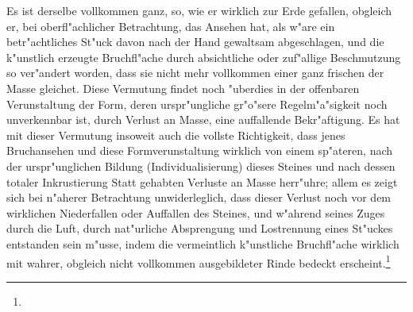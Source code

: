 \documentclass[a4paper, 11pt, oneside, german]{article}
\begin{document}
Es ist derselbe vollkommen ganz, so, wie er wirklich zur Erde gefallen, obgleich er, bei oberfl"achlicher Betrachtung, das Ansehen hat, als w"are ein betr"achtliches St"uck davon nach der Hand gewaltsam abgeschlagen, und die k"unstlich erzeugte Bruchfl"ache durch absichtliche oder zuf"allige Beschmutzung so ver"andert worden, dass sie nicht mehr vollkommen einer ganz frischen der Masse gleichet. Diese Vermutung findet noch "uberdies in der offenbaren Verunstaltung der Form, deren urspr"ungliche gr"o"sere Regelm"a"sigkeit noch unverkennbar ist, durch Verlust an Masse, eine auffallende Bekr"aftigung. Es hat mit dieser Vermutung insoweit auch die vollste Richtigkeit, dass jenes Bruchansehen und diese Formverunstaltung wirklich von einem sp"ateren, nach der urspr"unglichen Bildung (Individualisierung) dieses Steines und nach dessen totaler Inkrustierung Statt gehabten Verluste an Masse herr"uhre; allem es zeigt sich bei n"aherer Betrachtung unwiderleglich, dass dieser Verlust noch vor dem wirklichen Niederfallen oder Auffallen des Steines, und w"ahrend seines Zuges durch die Luft, durch nat"urliche Absprengung und Lostrennung eines St"uckes entstanden sein m"usse, indem die vermeintlich k"unstliche Bruchfl"ache wirklich mit wahrer, obgleich nicht vollkommen ausgebildeter Rinde bedeckt erscheint.\footnote{}
\end{document}
